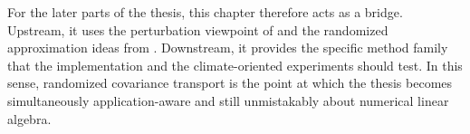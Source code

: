 For the later parts of the thesis, this chapter therefore acts as a bridge. Upstream, it uses the perturbation viewpoint of  and the randomized approximation ideas from . Downstream, it provides the specific method family that the implementation and the climate-oriented experiments should test. In this sense, randomized covariance transport is the point at which the thesis becomes simultaneously application-aware and still unmistakably about numerical linear algebra.
